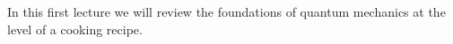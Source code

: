 In this first lecture we will review the foundations of quantum mechanics at the level of a cooking recipe. 
